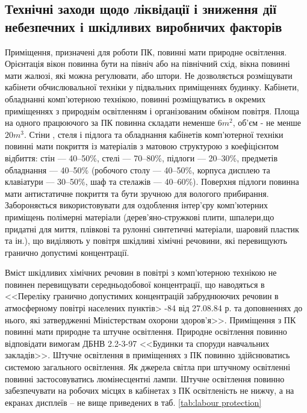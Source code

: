 \subsection{Технічні заходи щодо ліквідації і зниження дії небезпечних
 і шкідливих виробничих факторів}

Приміщення, призначені для роботи ПК, повинні мати природне освітлення. Орієнтація вікон повинна бути на північ або на північний схід, вікна повинні мати жалюзі, які можна регулювати, або штори.
Не дозволяється розміщувати кабінети обчислювальної техніки у підвальних приміщеннях будинку. Кабінети, обладнанні комп’ютерною технікою, повинні розміщуватись в окремих приміщеннях з природнім освітленням і організованим обміном повітря. Площа на одного працюючого за ПК повинна складати неменше $6 m^2$, об’єм  - не менше $20 m^3$. Стіни , стеля і підлога та обладнання кабінетів комп’ютерної техніки повинні мати покриття із матеріалів з матовою структурою з коефіцієнтом відбиття: стін --- 40--50\%, стелі --- 70--80\%, підлоги --- 20--30\%, предметів обладнання --- 40--50\% (робочого столу  --- 40--50\%, корпуса дисплею та  клавіатури --- 30--50\%, шаф та стелажів --- 40--60\%). Поверхня підлоги повинна  мати антистатичне покриття та бути зручною для вологого прибирання. Забороняється використовувати для оздоблення інтер’єру  комп’ютерних приміщень полімерні матеріали (дерев’яно-стружкові плити, шпалери,що придатні для миття, плівкові та рулонні синтетичні матеріали, шаровий пластик та ін.), що виділяють у повітря шкідливі хімічні речовини, які перевищують гранично допустимі концентрації.

Вміст шкідливих хімічних речовин в повітрі з комп’ютерною технікою не повинен перевищувати середньодобової концентрації, що наводяться в <<Переліку гранично допустимих концентрацій забруднюючих речовин в атмосферному повітрі населених пунктів> -84 від 27.08.84 р. та доповненнях до нього, які затвердженні Міністерствам охорони здоров’я>>.
Приміщення з ПК повинні мати природне та штучне освітлення. Природне освітлення повинно відповідати вимогам ДБНВ 2.2-3-97  <<Будинки та споруди навчальних закладів>>. Штучне освітлення в приміщеннях з ПК повинно здійснюватись системою загального освітлення. Як джерела світла при штучному освітленні повинні застосовуватись люмінесцентні лампи. Штучне освітлення повинно забезпечувати на робочих місцях в кабінетах з ПК освітленість не нижчу, а на екранах дисплеїв – не вище приведених в таб. \ref{tab:labour protection}

